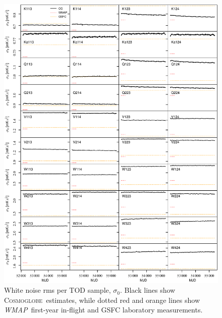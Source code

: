 \documentclass[twocolumn]{../../common/aa}
\def\WMAP{\emph{WMAP}}
\newcommand{\cosmoglobe}{\textsc{Cosmoglobe}}
\begin{document}
\begin{figure}[p]
	\centering
	\includegraphics[width=\textwidth]{figures/instpar_CG_sigma0_v1.pdf}
	\caption{White noise rms per TOD sample, $\sigma_0$. Black lines show \cosmoglobe\ estimates, while dotted red and orange lines show \WMAP\ first-year in-flight and GSFC laboratory measurements.}
	\label{fig:sigma0}
\end{figure}
\end{document}
